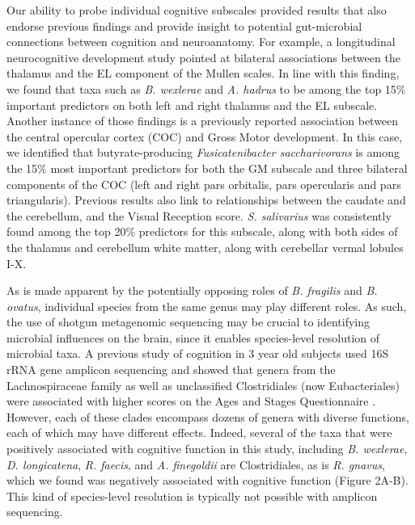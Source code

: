 \documentclass{article}
\begin{document}
Our ability to probe individual cognitive subscales provided
results that also endorse previous findings and provide insight to
potential gut-microbial connections between cognition and neuroanatomy.
For example, a longitudinal neurocognitive development study pointed at bilateral
associations between the thalamus and the EL component of the Mullen scales\cite{chenLongitudinalBrainMullen2023}.
In line with this finding, we found that taxa such as 
\textit{B. wexlerae} and \textit{A. hadrus} to be among the top 15\% important predictors
on both left and right thalamus and the EL subscale.
Another instance of those findings is a previously reported association between
the central opercular cortex (COC) and Gross Motor development\cite{jiangBrainNetworkCognition2023}. In this case, we identified that
butyrate-producing \textit{Fusicatenibacter saccharivorans} is among the 15\% most important predictors
for both the GM subscale and three bilateral components of the COC
(left and right pars orbitalis, pars opercularis and pars triangularis).
Previous results also link to relationships between the caudate and the cerebellum,
and the Visual Reception score\cite{deoniMyelinationMullenPreprint2022}.
\textit{S. salivarius} was consistently found among the top 20\% predictors for this subscale, along with
both sides of the thalamus and cerebellum white matter, along with cerebellar vermal lobules I-X.

As is made apparent by the potentially opposing roles of 
\textit{B. fragilis} and \textit{B. ovatus},
individual species from the same genus may play different roles.
As such, the use of shotgun metagenomic sequencing
may be crucial to identifying microbial influences on the brain,
since it enables species-level resolution of microbial taxa.
A previous study of
cognition in 3 year old subjects used 16S rRNA gene amplicon sequencing
and showed that genera from the Lachnospiraceae family as well as
unclassified Clostridiales (now Eubacteriales) were associated with
higher scores on the Ages and Stages Questionnaire
\cite{sordilloAssociationInfantGut2019}.
However, each of these clades encompass dozens of genera with
diverse functions, each of which may have different effects. Indeed,
several of the taxa that were positively associated with cognitive
function in this study, including \emph{B. wexlerae}, \emph{D.
longicatena}, \emph{R. faecis}, and \emph{A. finegoldii} are
Clostridiales, as is \emph{R. gnavus}, which we found was negatively
associated with cognitive function (Figure 2A-B). This kind of
species-level resolution is typically not possible with amplicon
sequencing.
\end{document}
